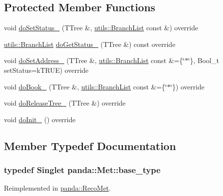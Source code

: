 \subsection*{Protected Member Functions}
\begin{DoxyCompactItemize}
\item 
void \hyperlink{classpanda_1_1Met_a3ed51e1633313fa1fb5f5dbda38108c8}{doSetStatus\_\-} (TTree \&, \hyperlink{classpanda_1_1utils_1_1BranchList}{utils::BranchList} const \&) override
\item 
\hyperlink{classpanda_1_1utils_1_1BranchList}{utils::BranchList} \hyperlink{classpanda_1_1Met_aa3b7a9f0bbbc48a0dbf21909c0c18d30}{doGetStatus\_\-} (TTree \&) const override
\item 
void \hyperlink{classpanda_1_1Met_aa3d27a3592eefcbd69ff73c6c8e70112}{doSetAddress\_\-} (TTree \&, \hyperlink{classpanda_1_1utils_1_1BranchList}{utils::BranchList} const \&=\{\char`\"{}$\ast$\char`\"{}\}, Bool\_\-t setStatus=kTRUE) override
\item 
void \hyperlink{classpanda_1_1Met_a83b50dafc33d3e97271e54ad1709e16e}{doBook\_\-} (TTree \&, \hyperlink{classpanda_1_1utils_1_1BranchList}{utils::BranchList} const \&=\{\char`\"{}$\ast$\char`\"{}\}) override
\item 
void \hyperlink{classpanda_1_1Met_a6df0a7e59b6d57c0e2b86702383f509d}{doReleaseTree\_\-} (TTree \&) override
\item 
void \hyperlink{classpanda_1_1Met_a72f7fac415a4777315b1e170aa1afca4}{doInit\_\-} () override
\end{DoxyCompactItemize}


\subsection{Member Typedef Documentation}
\hypertarget{classpanda_1_1Met_a1676ccce630ca27435393bad8059cfcc}{
\subsubsection[{base\_\-type}]{\setlength{\rightskip}{0pt plus 5cm}typedef {\bf Singlet} {\bf panda::Met::base\_\-type}}}
\label{classpanda_1_1Met_a1676ccce630ca27435393bad8059cfcc}


Reimplemented in \hyperlink{classpanda_1_1RecoMet_a08f27abd8ffe21cbfa4b44ce77a19bf3}{panda::RecoMet}.

